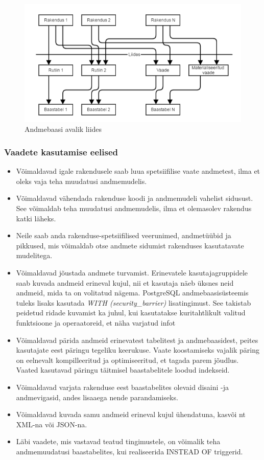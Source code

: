 \documentclass[a4paper,12pt]{article} %
\begin{document}
\begin{figure}[H]
\begin{center}
\includegraphics[bb=0 0 606 330,scale=0.6]{./diagrams/db-interface.png}
\caption{Andmebaasi avalik liides}
\end{center}
\end{figure}

\subsubsection{Vaadete kasutamise eelised}
\begin{itemize}
\item Võimaldavad igale rakendusele saab luua spetsiifilise vaate andmetest, ilma et oleks vaja teha muudatusi andmemudelis.
\item Võimaldavad vähendada rakenduse koodi ja andmemudeli vahelist sidusust.
See võimaldab teha muudatusi andmemudelis, ilma et olemasolev rakendus katki läheks.
\item Neile saab anda rakenduse-spetsiifilised veerunimed, andmetüübid ja pikkused, mis võimaldab otse andmete sidumist rakenduses kasutatavate mudelitega.
\item Võimaldavad jõustada andmete turvamist. Erinevatele kasutajagruppidele saab kuvada andmeid erineval kujul, nii et kasutaja näeb üksnes neid andmeid, mida ta on volitatud nägema. PostgreSQL andmebaasisüsteemis tuleks lisaks kasutada \textit{WITH (security\_barrier)} lisatingimust. See takistab peidetud ridade kuvamist ka juhul, kui kasutatakse kuritahtlikult valitud funktsioone ja operaatoreid, et näha varjatud infot \cite{PostgreSQLRulesAndPrivileges}
\item Võimaldavad pärida andmeid erinevatest tabelitest ja andmebaasidest, peites kasutajate eest päringu tegeliku keerukuse. Vaate koostamiseks vajalik päring on eelnevalt kompilleeritud ja optimiseeritud, et tagada parem jõudlus. Vaated kasutavad päringu täitmisel baastabelitele loodud indekseid.
\item Võimaldavad varjata rakenduse eest baastabelites olevaid disaini -ja andmevigasid, andes lisaaega nende parandamiseks.
\item Võimaldavad kuvada samu andmeid erineval kujul ühendatuna, kasvõi nt XML-na või JSON-na.
\item Läbi vaadete, mis vastavad teatud tingimustele, on võimalik teha andmemuudatusi baastabelites, kui realiseerida INSTEAD OF triggerid.
\end{itemize}
\cite[lk 172-173]{BuildingTheAgileDatabase}
\end{document}
